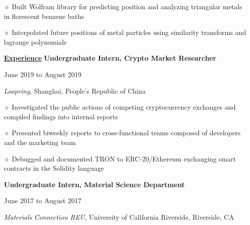 \documentclass [11pt]{article}
\begin{document}
\begin{flushleft}
‭‭\quad\quad\quad$\diamond$ ‭Built Wolfram library for predicting position and analyzing triangular metals in florescent benzene baths

‭‭\quad\quad\quad$\diamond$ Interpolated future positions of metal particles using similarity transforms and lagrange polynomials
%
‭‭%
%
‭‭%

\vspace{7}
\underline{\textbf{Experience}}
\linebreak
\textbf{Undergraduate Intern, Crypto Market Researcher}\begin{minipage}{0.55 \linewidth}\begin{flushright}June 2019 to August 2019\end{flushright}\end{minipage}
\emph{Loopring}, Shanghai, People's Republic of China

‭‭\quad\quad\quad$\diamond$ Investigated the public actions of competing cryptocurrency exchanges and compiled findings into internal reports

\quad\quad\quad$\diamond$ Presented biweekly reports to cross-functional teams composed of developers and the marketing team

‭‭\quad\quad\quad$\diamond$ Debugged and documented TRON to ERC-20/Ethereum exchanging smart contracts in the Solidity language

\linebreak
\textbf{Undergraduate Intern, Material Science Department}\begin{minipage}{0.535 \linewidth}\begin{flushright}June 2017 to August 2017\end{flushright}\end{minipage}
\emph{Materials Connection REU}, University of California Riverside, Riverside, CA


\end{flushleft}
\end{document}
